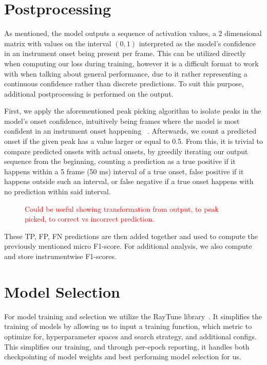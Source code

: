 \section{Postprocessing}

As mentioned, the model outputs a sequence of activation values, a 2 dimensional matrix with values on the interval $(0, 1)$ interpreted as the model's confidence in an instrument onset being present per frame. This can be utilized directly when computing our loss during training, however it is a difficult format to work with when talking about general performance, due to it rather representing a continuous confidence rather than discrete predictions. To suit this purpose, additional postprocessing is performed on the output.

First, we apply the aforementioned peak picking algorithm to isolate peaks in the model's onset confidence, intuitively being frames where the model is most confident in an instrument onset happening ~\cite{Bck2012EvaluatingTO, vogl2018multiinstrumentdrumtranscription}. Afterwards, we count a predicted onset if the given peak has a value larger or equal to 0.5. From this, it is trivial to compare predicted onsets with actual onsets, by greedily iterating our output sequence from the beginning, counting a prediction as a true positive if it happens within a 5 frame (50 ms) interval of a true onset, false positive if it happens outside such an interval, or false negative if a true onset happens with no prediction within said interval.

\begin{figure}[H]
    \centering
    \textcolor{red}{Could be useful showing transformation from output, to peak picked, to correct vs incorrect prediction.}
\end{figure}

These \gls{TP}, \gls{FP}, \gls{FN} predictions are then added together and used to compute the previously mentioned micro F1-score. For additional analysis, we also compute and store instrumentwise F1-scores.

\section{Model Selection}

For model training and selection we utilize the RayTune library~\cite{liaw2018tuneresearchplatformdistributed}. It simplifies the training of models by allowing us to input a training function, which metric to optimize for, hyperparameter spaces and search strategy, and additional configs. This simplifies our training, and through per-epoch reporting, it handles both checkpointing of model weights and best performing model selection for us.

